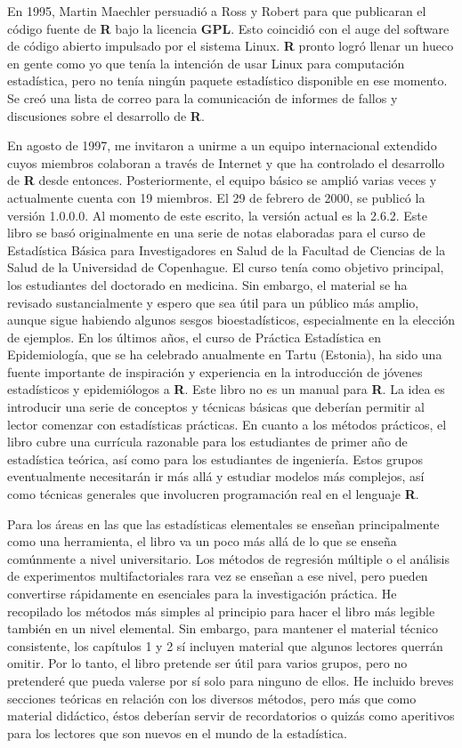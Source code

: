 \documentclass[spanish]{extbook}
\numberwithin{equation}{section}
\numberwithin{figure}{section}
\begin{document}
En 1995, Martin Maechler persuadió a Ross y Robert para que publicaran el
código fuente de \textbf{R} bajo la licencia \textbf{GPL}. Esto coincidió con
el auge del software de código abierto impulsado por el sistema Linux.
\textbf{R} pronto logró llenar un hueco en gente como yo que tenía la intención
de usar Linux para computación estadística, pero no tenía ningún paquete
estadístico disponible en ese momento. Se creó una lista de correo para la
comunicación de informes de fallos y discusiones sobre el desarrollo de
\textbf{R}.

En agosto de 1997, me invitaron a unirme a un equipo internacional extendido
cuyos miembros colaboran a través de Internet y que ha controlado el desarrollo
de \textbf{R} desde entonces. Posteriormente, el equipo básico se amplió varias
veces y actualmente cuenta con 19 miembros. El 29 de febrero de 2000, se
publicó la versión 1.0.0.0. Al momento de este escrito, la versión actual es la
2.6.2. Este libro se basó originalmente en una serie de notas elaboradas para
el curso de Estadística Básica para Investigadores en Salud de la Facultad de
Ciencias de la Salud de la Universidad de Copenhague. El curso tenía como
objetivo principal, los estudiantes del doctorado en medicina. Sin embargo, el
material se ha revisado sustancialmente y espero que sea útil para un público
más amplio, aunque sigue habiendo algunos sesgos bioestadísticos, especialmente
en la elección de ejemplos. En los últimos años, el curso de Práctica
Estadística en Epidemiología, que se ha celebrado anualmente en Tartu
(Estonia), ha sido una fuente importante de inspiración y experiencia en la
introducción de jóvenes estadísticos y epidemiólogos a \textbf{R}.  Este libro
no es un manual para \textbf{R}.  La idea es introducir una serie de conceptos
y técnicas básicas que deberían permitir al lector comenzar con estadísticas
prácticas. En cuanto a los métodos prácticos, el libro cubre una currícula
razonable para los estudiantes de primer año de estadística teórica, así como
para los estudiantes de ingeniería. Estos grupos eventualmente necesitarán ir
más allá y estudiar modelos más complejos, así como técnicas generales que
involucren programación real en el lenguaje \textbf{R}.

Para los áreas en las que las estadísticas elementales se enseñan
principalmente como una herramienta, el libro va un poco más allá de lo que se
enseña comúnmente a nivel universitario. Los métodos de regresión múltiple o el
análisis de experimentos multifactoriales rara vez se enseñan a ese nivel, pero
pueden convertirse rápidamente en esenciales para la investigación práctica. He
recopilado los métodos más simples al principio para hacer el libro más legible
también en un nivel elemental. Sin embargo, para mantener el material técnico
consistente, los capítulos 1 y 2 sí incluyen material que algunos lectores
querrán omitir. Por lo tanto, el libro pretende ser útil para varios grupos,
pero no pretenderé que pueda valerse por sí solo para ninguno de ellos. He
incluido breves secciones teóricas en relación con los diversos métodos, pero
más que como material didáctico, éstos deberían servir de recordatorios o
quizás como aperitivos para los lectores que son nuevos en el mundo de la
estadística.
\end{document}
